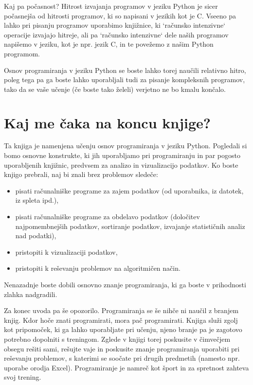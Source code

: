 Kaj pa počasnost? Hitrost izvajanja programov v jeziku Python je sicer počasnejša od hitrosti programov, ki so napisani v jezikih kot je C. Vseeno pa lahko pri pisanju programov uporabimo knjižnice, ki `računsko intenzivne` operacije izvajajo hitreje, ali pa `računsko intenzivne` dele naših programov napišemo v jeziku, kot je npr. jezik C, in te povežemo z našim Python programom.

Osnov programiranja v jeziku Python se boste lahko torej naučili relativno hitro, poleg tega pa ga boste lahko uporabljali tudi za pisanje kompleksnih programov, tako da se vaše učenje (če boste tako želeli) verjetno ne bo kmalu končalo. 


\section{Kaj me čaka na koncu knjige?} 

Ta knjiga je namenjena učenju osnov programiranja v jeziku Python. Pogledali si bomo osnovne konstrukte, ki jih uporabljamo pri programiranju in par pogosto uporabljenih knjižnic, predvsem za analizo in vizualizacijo podatkov. Ko boste knjigo prebrali, naj bi znali brez problemov sledeče:
\begin{itemize}
    \item pisati računalniške programe za zajem podatkov (od uporabnika, iz datotek, iz spleta ipd.),
    \item pisati računalniške programe za obdelavo podatkov (določitev najpomembnejših podatkov, sortiranje podatkov, izvajanje statističnih analiz nad podatki),
    \item pristopiti k vizualizaciji podatkov,
    \item pristopiti k reševanju problemov na algoritmičen način.
\end{itemize}
Nenazadnje boste dobili osnovno znanje programiranja, ki ga boste v prihodnosti zlahka nadgradili. 

Za konec uvoda pa še opozorilo. Programiranja se še nihče ni naučil z branjem knjig. Kdor hoče znati programirati, mora pač programirati. Knjiga služi zgolj kot pripomoček, ki ga lahko uporabljate pri učenju, njeno branje pa je zagotovo potrebno dopolniti s treningom. Zglede v knjigi torej poskusite v čimvečjem obsegu rešiti sami, rešujte vaje in poskusite znanje programiranja uporabiti pri reševanju problemov, s katerimi se soočate pri drugih predmetih (namesto npr. uporabe orodja Excel). Programiranje je namreč kot šport in za spretnost zahteva svoj trening.


